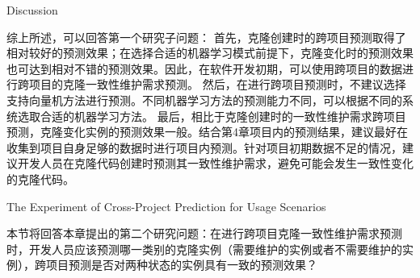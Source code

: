 
{Discussion}

综上所述，可以回答第一个研究子问题：
首先，克隆创建时的跨项目预测取得了相对较好的预测效果；在选择合适的机器学习模式前提下，克隆变化时的预测效果也可达到相对不错的预测效果。因此，在软件开发初期，可以使用跨项目的数据进行跨项目的克隆一致性维护需求预测。
然后，在进行跨项目预测时，不建议选择支持向量机方法进行预测。不同机器学习方法的预测能力不同，可以根据不同的系统选取合适的机器学习方法。
最后，相比于克隆创建时的一致性维护需求跨项目预测，克隆变化实例的预测效果一般。结合第4章项目内的预测结果，建议最好在收集到项目自身足够的数据时进行项目内预测。针对项目初期数据不足的情况，建议开发人员在克隆代码创建时预测其一致性维护需求，避免可能会发生一致性变化的克隆代码。

{The Experiment of Cross-Project Prediction for Usage Scenarios}

本节将回答本章提出的第二个研究问题：在进行跨项目克隆一致性维护需求预测时，开发人员应该预测哪一类别的克隆实例（需要维护的实例或者不需要维护的实例），跨项目预测是否对两种状态的实例具有一致的预测效果？

